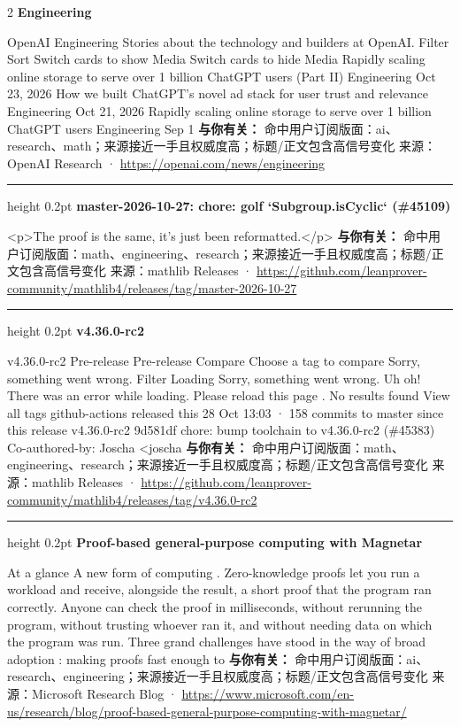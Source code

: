 \documentclass[10.5pt]{ctexart}
\begin{document}
\begin{multicols}{2}
{\large\bfseries Engineering}\par
OpenAI Engineering Stories about the technology and builders at OpenAI. Filter Sort Switch cards to show Media Switch cards to hide Media Rapidly scaling online storage to serve over 1 billion ChatGPT users (Part II) Engineering Oct 23, 2026 How we built ChatGPT’s novel ad stack for user trust and relevance Engineering Oct 21, 2026 Rapidly scaling online storage to serve over 1 billion ChatGPT users Engineering Sep 1
\textbf{与你有关：} 命中用户订阅版面：ai、research、math；来源接近一手且权威度高；标题/正文包含高信号变化
{\footnotesize\color{ormuted} 来源：OpenAI Research · \url{https://openai.com/news/engineering}}
\vspace{2mm}
\hrule height 0.2pt
\vspace{2mm}
{\large\bfseries master-2026-10-27: chore: golf `Subgroup.isCyclic` (\#45109)}\par
<p>The proof is the same, it's just been reformatted.</p>
\textbf{与你有关：} 命中用户订阅版面：math、engineering、research；来源接近一手且权威度高；标题/正文包含高信号变化
{\footnotesize\color{ormuted} 来源：mathlib Releases · \url{https://github.com/leanprover-community/mathlib4/releases/tag/master-2026-10-27}}
\vspace{2mm}
\hrule height 0.2pt
\vspace{2mm}
{\large\bfseries v4.36.0-rc2}\par
v4.36.0-rc2 Pre-release Pre-release Compare Choose a tag to compare Sorry, something went wrong. Filter Loading Sorry, something went wrong. Uh oh! There was an error while loading. Please reload this page . No results found View all tags github-actions released this 28 Oct 13:03 · 158 commits to master since this release v4.36.0-rc2 9d581df chore: bump toolchain to v4.36.0-rc2 (\#45383) Co-authored-by: Joscha <joscha
\textbf{与你有关：} 命中用户订阅版面：math、engineering、research；来源接近一手且权威度高；标题/正文包含高信号变化
{\footnotesize\color{ormuted} 来源：mathlib Releases · \url{https://github.com/leanprover-community/mathlib4/releases/tag/v4.36.0-rc2}}
\vspace{2mm}
\hrule height 0.2pt
\vspace{2mm}
{\large\bfseries Proof-based general-purpose computing with Magnetar}\par
At a glance A new form of computing . Zero-knowledge proofs let you run a workload and receive, alongside the result, a short proof that the program ran correctly. Anyone can check the proof in milliseconds, without rerunning the program, without trusting whoever ran it, and without needing data on which the program was run. Three grand challenges have stood in the way of broad adoption : making proofs fast enough to
\textbf{与你有关：} 命中用户订阅版面：ai、research、engineering；来源接近一手且权威度高；标题/正文包含高信号变化
{\footnotesize\color{ormuted} 来源：Microsoft Research Blog · \url{https://www.microsoft.com/en-us/research/blog/proof-based-general-purpose-computing-with-magnetar/}}
\end{multicols}
\end{document}
